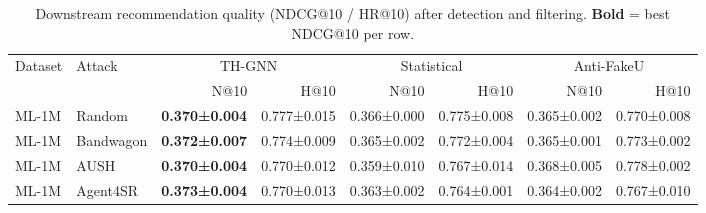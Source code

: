 \begin{table}[t]
\centering
\small
\caption{Downstream recommendation quality (NDCG@10 / HR@10) after detection and filtering.  \textbf{Bold} = best NDCG@10 per row.}
\label{tab:downstream_ndcg}
\begin{tabular}{llrrrrrr}
\toprule
Dataset & Attack & \multicolumn{2}{c}{TH-GNN} & \multicolumn{2}{c}{Statistical} & \multicolumn{2}{c}{Anti-FakeU} \\
\cmidrule(lr){3-8}
 &  & N@10 & H@10 & N@10 & H@10 & N@10 & H@10 \\
\midrule
ML-1M & Random & \textbf{0.370±0.004} & 0.777±0.015 & 0.366±0.000 & 0.775±0.008 & 0.365±0.002 & 0.770±0.008 \\
ML-1M & Bandwagon & \textbf{0.372±0.007} & 0.774±0.009 & 0.365±0.002 & 0.772±0.004 & 0.365±0.001 & 0.773±0.002 \\
ML-1M & AUSH & \textbf{0.370±0.004} & 0.770±0.012 & 0.359±0.010 & 0.767±0.014 & 0.368±0.005 & 0.778±0.002 \\
ML-1M & Agent4SR & \textbf{0.373±0.004} & 0.770±0.013 & 0.363±0.002 & 0.764±0.001 & 0.364±0.002 & 0.767±0.010 \\
\bottomrule
\end{tabular}
\end{table}